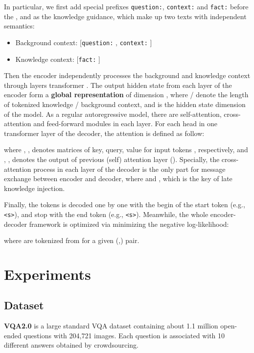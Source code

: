 \documentclass[sigconf]{acmart}
\newcommand{\cjy}[1]{{\color{black}#1}}
\begin{document}
In particular, we first add special prefixes  {\tt question:}, {\tt context:} and {\tt fact:} 
before the ,  and  as the knowledge guidance, which make up two texts with independent semantics: 
\begin{itemize}
	\item Background context:  [{\tt question:} , {\tt context:} ]
	\item Knowledge context: [{\tt fact:} ]
\end{itemize}
Then the encoder independently processes the background and knowledge context through   layers transformer \citep{DBLP:conf/nips/VaswaniSPUJGKP17}. 
The output hidden state from each layer of the encoder form a \textbf{global representation}  of dimension , where  /  denote the length of tokenized knowledge / background context, and  is the  hidden state dimension of the model. 
As a regular autoregressive model, there are self-attention, cross-attention and feed-forward modules in each layer. For each head in one transformer layer of the decoder, the attention is defined as follow:

where , ,  denotes matrices of key, query, value for input tokens \citep{DBLP:conf/nips/VaswaniSPUJGKP17}, respectively, and 
, ,  denotes the output of previous (self) attention layer ().
Specially, the cross-attention process in each layer of the decoder is the only part for message exchange between encoder and decoder, where  and , which is the key of late knowledge injection.

Finally, the  tokens is decoded one by one with the begin of the start token (e.g., {\tt <s>}), and stop with the  end token (e.g., {\tt <s>}). Meanwhile, the whole encoder-decoder framework is optimized via minimizing the negative log-likelihood:

where   are tokenized from  for a given (,) pair.


\section{Experiments}
\subsection{Dataset}

\noindent\textbf{VQA2.0}
\citep{antol2015vqa} is a large standard VQA dataset containing about 1.1 million open-ended questions with 204,721 images. Each question is associated with 10 different answers obtained by \cjy{crowdsourcing}.
\end{document}
